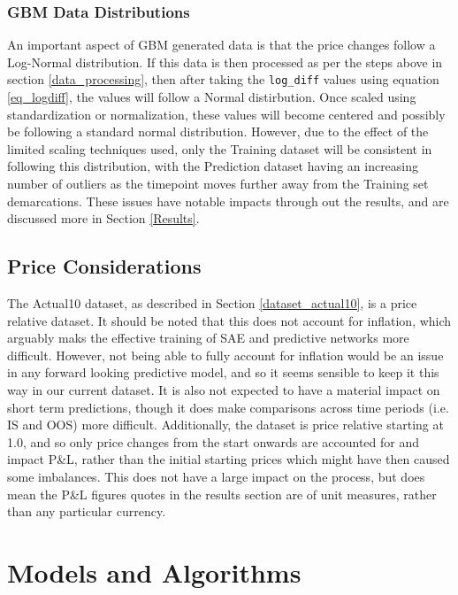 \documentclass[a4paper,11pt,oneside]{article}
\theoremstyle{plain}
\theoremstyle{definition}
\begin{document}
\subsubsection{GBM Data Distributions}

An important aspect of GBM generated data is that the price changes follow a Log-Normal distribution. If this data is then processed as per the steps above in section \ref{data_processing}, then after taking the \texttt{log\_diff} values using equation \eqref{eq_logdiff}, the values will follow a Normal distirbution. Once scaled using standardization or normalization, these values will become centered and possibly be following a standard normal distribution. However, due to the effect of the limited scaling techniques used, only the Training dataset will be consistent in following this distribution, with the Prediction dataset having an increasing number of outliers as the timepoint moves further away from the Training set demarcations. These issues have notable impacts through out the results, and are discussed more in Section \ref{Results}.

\subsection{Price Considerations}\label{data_prices}

The Actual10 dataset, as described in Section \ref{dataset_actual10}, is a price relative dataset. It should be noted that this does not account for inflation, which arguably maks the effective training of SAE and predictive networks more difficult. However, not being able to fully account for inflation would be an issue in any forward looking predictive model, and so it seems sensible to keep it this way in our current dataset. It is also not expected to have a material impact on short term predictions, though it does make comparisons across time periods (i.e. IS and OOS) more difficult. Additionally, the dataset is price relative starting at 1.0, and so only price changes from the start onwards are accounted for and impact P\&L, rather than the initial starting prices which might have then caused some imbalances. This does not have a large impact on the process, but does mean the P\&L figures quotes in the results section are of unit measures, rather than any particular currency.

\newpage
\section{Models and Algorithms}\label{Implementation}
\end{document}
